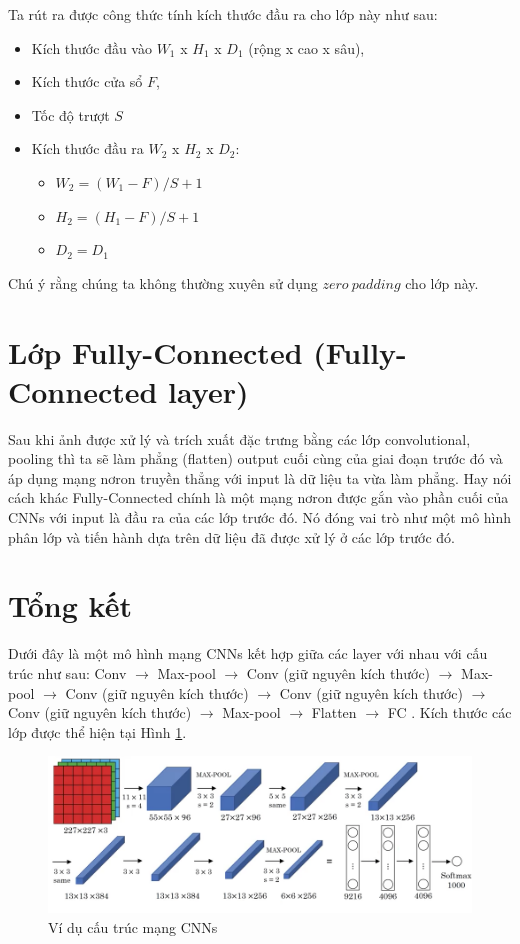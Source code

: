 \hspace{5mm} Ta rút ra được công thức tính kích thước đầu ra cho lớp này như sau:
\begin{itemize}
	\item Kích thước đầu vào \textbf{$W_1$} x \textbf{$H_1$} x \textbf{$D_1$} (rộng x cao x sâu),
	\item Kích thước cửa sổ \textbf{$F$},	
	\item Tốc độ trượt \textbf{$S$}
	\item Kích thước đầu ra \textbf{$W_2$} x \textbf{$H_2$} x \textbf{$D_2$}:
	\begin{itemize}
		\item  \textbf{$W_2 = (W_1 - F)/S +1$}
		\item  \textbf{$H_2 = (H_1 - F)/S +1$}
		\item \textbf{$D_2 = D_1$}
	\end{itemize}	 
\end{itemize}
Chú ý rằng chúng ta không thường xuyên sử dụng $zero~padding$ cho lớp này.
\section{Lớp Fully-Connected (Fully-Connected layer)}
\hspace{5mm} Sau khi ảnh được xử lý và trích xuất đặc trưng bằng các lớp convolutional, pooling thì ta sẽ làm phẳng (flatten) output cuối cùng của giai đoạn trước đó và áp dụng mạng nơron truyền thẳng với input là dữ liệu ta vừa làm phẳng. Hay nói cách khác Fully-Connected chính là một mạng nơron được gắn vào phần cuối của CNNs với input là đầu ra của các lớp trước đó. Nó đóng vai trò như một mô hình phân lớp và tiến hành dựa trên dữ liệu đã được xử lý ở các lớp trước đó.
\section{Tổng kết}
\hspace{5mm} Dưới đây là một mô hình mạng CNNs kết hợp giữa các layer với nhau với cấu trúc như sau: Conv $\to$ Max-pool $\to$ Conv (giữ nguyên kích thước) $\to$ Max-pool $\to$ Conv (giữ nguyên kích thước) $\to$ Conv (giữ nguyên kích thước) $\to$ Conv (giữ nguyên kích thước) $\to$ Max-pool $\to$ Flatten $\to$ FC . Kích thước các lớp được thể hiện tại Hình \ref{fig:CNN}.
\begin{center}
\begin{figure}[H]
	\begin{center}
		\includegraphics[scale=0.5]{chap4/image/CNN.png}
	\end{center}
	\caption{Ví dụ cấu trúc mạng CNNs}
	\label{fig:CNN}
\end{figure}
\end{center}
